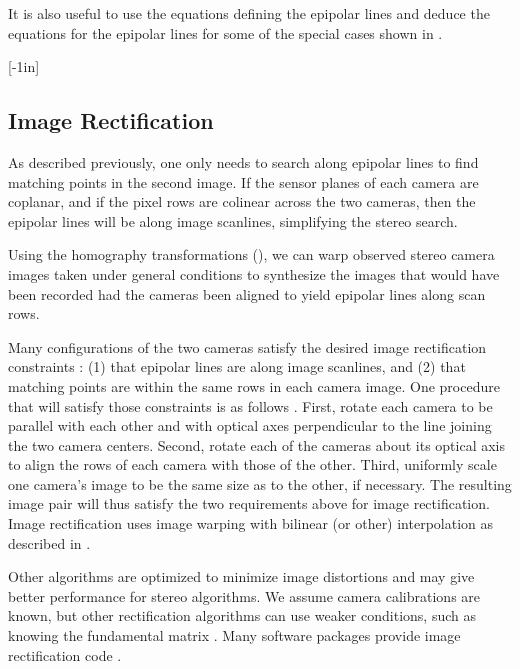 It is also useful to use the equations defining the epipolar lines and deduce the equations for the epipolar lines for some of the special cases shown in \fig{\ref{fig:epipolarlinesgame}}.

[-1in]

\subsection{Image Rectification}


As described previously, one only needs to search along epipolar lines to find matching points in the second image.  If the sensor planes of each camera are coplanar, and if the pixel rows are colinear across the two cameras, then the epipolar lines will be along image scanlines, simplifying the stereo search.


Using the homography transformations (\chap{\ref{chapter:homography}}), we can warp observed stereo camera images taken under general conditions to synthesize the images that would have been recorded had the cameras been aligned to yield epipolar lines along scan rows.


Many configurations of the two cameras satisfy the desired image rectification constraints \cite{Zhang2003}: (1) that epipolar lines are along image scanlines, and (2) that matching points are within the same rows in each camera image.  One procedure that will satisfy those constraints is as follows \cite{wikiRectification2021}.  First, rotate each camera to be parallel with each other and with optical axes perpendicular to the line joining the two camera centers.  Second, rotate each of the cameras about its optical axis to align the rows of each camera with those of the other.  Third, uniformly scale one camera's image to be the same size as to the other, if necessary.  The resulting image pair will thus satisfy the two requirements above for image rectification. Image rectification uses image warping with bilinear (or other) interpolation as described in \sect{\ref{sec:bilinearinterpolation}}.

Other algorithms are optimized to minimize image distortions \cite{Zhang2003} and may give better performance for stereo algorithms.  We assume camera calibrations are known, but other rectification algorithms can use weaker conditions, such as knowing the fundamental matrix \cite{Hartley2004,Pollefeys99}. Many software packages provide image rectification code \cite{Zhang99}.



